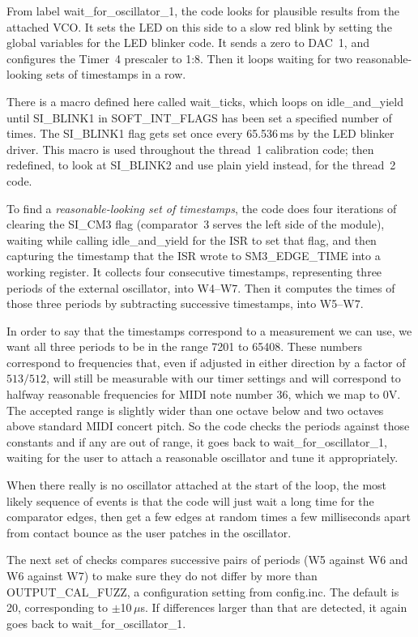 From label wait\_for\_oscillator\_1, the code looks for plausible results
from the attached VCO.  It sets the LED on this side to a slow red blink by
setting the global variables for the LED blinker code.  It sends a zero to
DAC~1, and configures the Timer~4 prescaler to 1:8.  Then it loops waiting
for two reasonable-looking sets of timestamps in a row.

There is a macro defined here called wait\_ticks, which loops on
idle\_and\_yield until SI\_BLINK1 in SOFT\_INT\_FLAGS has been set a
specified number of times.  The SI\_BLINK1 flag gets set once every 65.536\,ms
by the LED blinker driver.  This macro is used throughout the thread~1
calibration code; then redefined, to look at SI\_BLINK2 and use plain yield
instead, for the thread~2 code.

To find a \emph{reasonable-looking set of timestamps}, the code does four
iterations of clearing the SI\_CM3 flag (comparator~3 serves the left side
of the module), waiting while calling idle\_and\_yield for the ISR to set
that flag, and then capturing the timestamp that the ISR wrote to
SM3\_EDGE\_TIME into a working register.  It collects four consecutive
timestamps, representing three periods of the external oscillator, into
W4--W7.  Then it computes the times of those three periods by subtracting
successive timestamps, into W5--W7.

In order to say that the timestamps correspond to a measurement we can use,
we want all three periods to be in the range 7201 to 65408.  These numbers
correspond to frequencies that, even if adjusted in either direction by a
factor of $513/512$, will still be measurable with our timer settings and
will correspond to halfway reasonable frequencies for MIDI note number 36,
which we map to 0V.  The accepted range is slightly wider than one octave
below and two octaves above standard MIDI concert pitch.  So the code checks
the periods against those constants and if any are out of range, it goes
back to wait\_for\_oscillator\_1, waiting for the user to attach a
reasonable oscillator and tune it appropriately.

When there really is no oscillator attached at the start of the loop, the
most likely sequence of events is that the code will just wait a long time
for the comparator edges, then get a few edges at random times a few
milliseconds apart from contact bounce as the user patches in the
oscillator.

The next set of checks compares successive pairs of periods (W5 against W6
and W6 against W7) to make sure they do not differ by more than
OUTPUT\_CAL\_FUZZ, a configuration setting from config.inc.  The default is
20, corresponding to $\pm$10\,$\mu$s.  If differences larger than that
are detected, it again goes back to wait\_for\_oscillator\_1.

